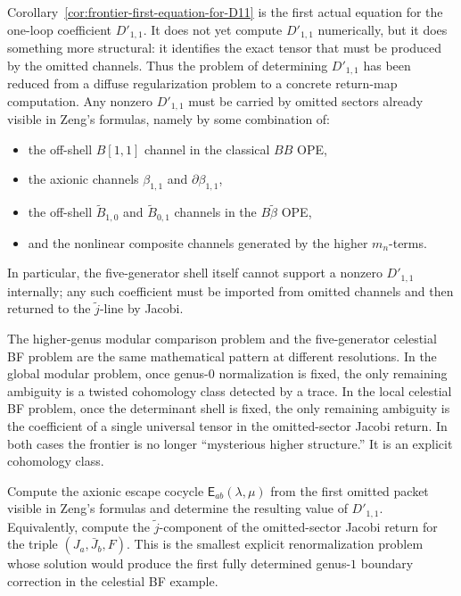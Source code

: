 \begin{remark}
\label{rem:frontier-first-genuine-quantum-equation}
Corollary~\ref{cor:frontier-first-equation-for-D11} is the first actual
equation for the one-loop coefficient $D'_{1,1}$.
It does not yet compute $D'_{1,1}$ numerically, but it does something more
structural: it identifies the exact tensor that must be produced by the
omitted channels.
Thus the problem of determining $D'_{1,1}$ has been reduced from a diffuse
regularization problem to a concrete return-map computation.
Any nonzero $D'_{1,1}$ must be carried by omitted sectors already visible in
Zeng's formulas, namely by some combination of:
\begin{itemize}
\item the off-shell $B[1,1]$ channel in the classical $BB$ OPE,
\item the axionic channels $\beta_{1,1}$ and $\partial\beta_{1,1}$,
\item the off-shell $\widetilde B_{1,0}$ and $\widetilde B_{0,1}$ channels in
  the $B\widetilde\beta$ OPE,
\item and the nonlinear composite channels generated by the higher
  $m_n$-terms.
\end{itemize}
In particular, the five-generator shell itself cannot support a nonzero
$D'_{1,1}$ internally; any such coefficient must be imported from omitted
channels and then returned to the $\widetilde j$-line by Jacobi.
\end{remark}

\begin{insight}
\label{ins:frontier-one-mechanism-two-frontiers}
The higher-genus modular comparison problem and the five-generator celestial
BF problem are the same mathematical pattern at different resolutions.
In the global modular problem, once genus-$0$ normalization is fixed, the
only remaining ambiguity is a twisted cohomology class detected by a trace.
In the local celestial BF problem, once the determinant shell is fixed, the
only remaining ambiguity is the coefficient of a single universal tensor in
the omitted-sector Jacobi return.
In both cases the frontier is no longer ``mysterious higher structure.''
It is an explicit cohomology class.
\end{insight}

\begin{problem}
\label{prob:frontier-compute-axionic-escape-cocycle}
Compute the axionic escape cocycle
$\mathsf E_{ab}(\lambda,\mu)$
from the first omitted packet visible in Zeng's formulas and determine the
resulting value of $D'_{1,1}$.
Equivalently, compute the $\widetilde j$-component of the omitted-sector
Jacobi return for the triple $(J_a,\bar J_b,F)$.
This is the smallest explicit renormalization problem whose solution would
produce the first fully determined genus-$1$ boundary correction in the
celestial BF example.
\end{problem}
